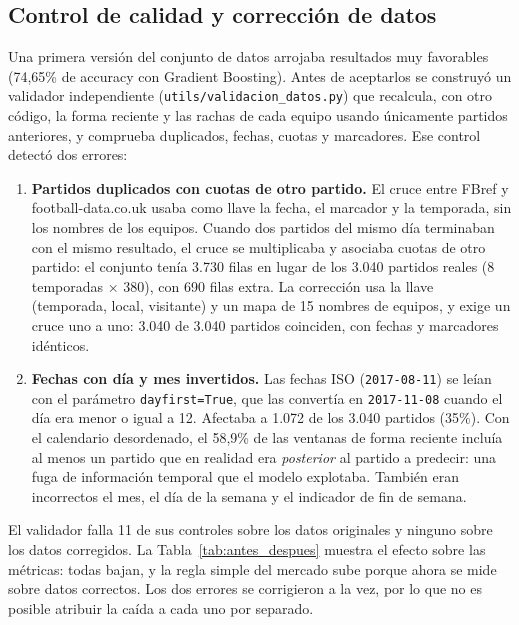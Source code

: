 \documentclass{ieeeaccess}
\begin{document}
\subsection{Control de calidad y corrección de datos}
\label{sec:calidad}
Una primera versión del conjunto de datos arrojaba resultados muy favorables (74,65\% de accuracy con Gradient Boosting). Antes de aceptarlos se construyó un validador independiente (\texttt{utils/validacion\_datos.py}) que recalcula, con otro código, la forma reciente y las rachas de cada equipo usando únicamente partidos anteriores, y comprueba duplicados, fechas, cuotas y marcadores. Ese control detectó dos errores:
\begin{enumerate}
\item \textbf{Partidos duplicados con cuotas de otro partido.} El cruce entre FBref y football-data.co.uk usaba como llave la fecha, el marcador y la temporada, sin los nombres de los equipos. Cuando dos partidos del mismo día terminaban con el mismo resultado, el cruce se multiplicaba y asociaba cuotas de otro partido: el conjunto tenía 3.730 filas en lugar de los 3.040 partidos reales (8 temporadas $\times$ 380), con 690 filas extra. La corrección usa la llave (temporada, local, visitante) y un mapa de 15 nombres de equipos, y exige un cruce uno a uno: 3.040 de 3.040 partidos coinciden, con fechas y marcadores idénticos.
\item \textbf{Fechas con día y mes invertidos.} Las fechas ISO (\texttt{2017-08-11}) se leían con el parámetro \texttt{dayfirst=True}, que las convertía en \texttt{2017-11-08} cuando el día era menor o igual a 12. Afectaba a 1.072 de los 3.040 partidos (35\%). Con el calendario desordenado, el 58,9\% de las ventanas de forma reciente incluía al menos un partido que en realidad era \textit{posterior} al partido a predecir: una fuga de información temporal que el modelo explotaba. También eran incorrectos el mes, el día de la semana y el indicador de fin de semana.
\end{enumerate}
El validador falla 11 de sus controles sobre los datos originales y ninguno sobre los datos corregidos. La Tabla~\ref{tab:antes_despues} muestra el efecto sobre las métricas: todas bajan, y la regla simple del mercado sube porque ahora se mide sobre datos correctos. Los dos errores se corrigieron a la vez, por lo que no es posible atribuir la caída a cada uno por separado.
\end{document}

